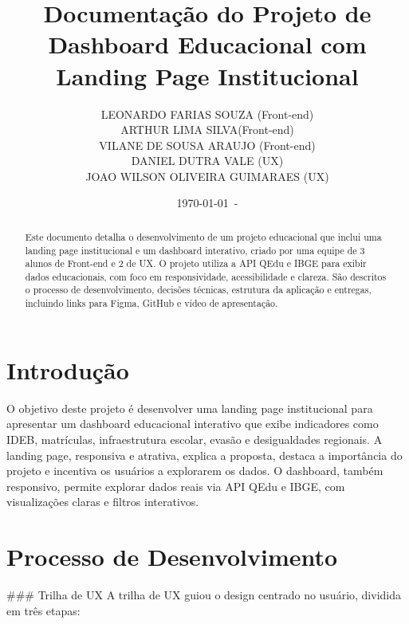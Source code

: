 \documentclass[a4paper,12pt]{article}
\begin{document}
\title{Documentação do Projeto de Dashboard Educacional com Landing Page Institucional}
\author{
    LEONARDO FARIAS SOUZA (Front-end) \\ 
    ARTHUR LIMA SILVA(Front-end) \\ 
    VILANE DE SOUSA ARAUJO (Front-end) \\ 
    DANIEL DUTRA VALE (UX) \\ 
    JOAO WILSON OLIVEIRA GUIMARAES (UX) \\ 
    
}
\date{\today\ - \currenttime}
\maketitle

\begin{abstract}
Este documento detalha o desenvolvimento de um projeto educacional que inclui uma landing page institucional e um dashboard interativo, criado por uma equipe de 3 alunos de Front-end e 2 de UX. O projeto utiliza a API QEdu e IBGE para exibir dados educacionais, com foco em responsividade, acessibilidade e clareza. São descritos o processo de desenvolvimento, decisões técnicas, estrutura da aplicação e entregas, incluindo links para Figma, GitHub e vídeo de apresentação.
\end{abstract}

\section*{Introdução}
O objetivo deste projeto é desenvolver uma landing page institucional para apresentar um dashboard educacional interativo que exibe indicadores como IDEB, matrículas, infraestrutura escolar, evasão e desigualdades regionais. A landing page, responsiva e atrativa, explica a proposta, destaca a importância do projeto e incentiva os usuários a explorarem os dados. O dashboard, também responsivo, permite explorar dados reais via API QEdu e IBGE, com visualizações claras e filtros interativos.

\section{Processo de Desenvolvimento}
### Trilha de UX
A trilha de UX guiou o design centrado no usuário, dividida em três etapas:
\end{document}
